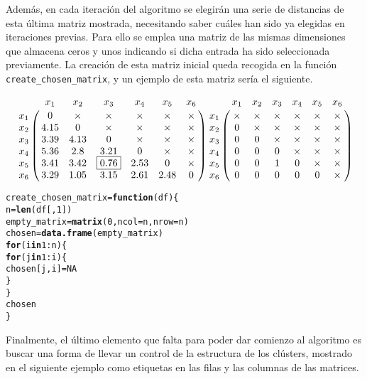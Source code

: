 \documentclass[12pt]{report}\usepackage[]{graphicx}\usepackage[dvipsnames]{xcolor}
\makeatletter
\newcommand{\hlnum}[1]{\textcolor[rgb]{0.686,0.059,0.569}{#1}}%
\newcommand{\hlopt}[1]{\textcolor[rgb]{0,0,0}{#1}}%
\newcommand{\hlstd}[1]{\textcolor[rgb]{0.345,0.345,0.345}{#1}}%
\newcommand{\hlkwa}[1]{\textcolor[rgb]{0.161,0.373,0.58}{\textbf{#1}}}%
\newcommand{\hlkwb}[1]{\textcolor[rgb]{0.69,0.353,0.396}{#1}}%
\newcommand{\hlkwc}[1]{\textcolor[rgb]{0.333,0.667,0.333}{#1}}%
\newcommand{\hlkwd}[1]{\textcolor[rgb]{0.737,0.353,0.396}{\textbf{#1}}}%
\newenvironment{kframe}{%
 \def\at@end@of@kframe{}%
 \ifinner\ifhmode%
  \def\at@end@of@kframe{\end{minipage}}%
  \begin{minipage}{\columnwidth}%
 \fi\fi%
 \def\FrameCommand##1{\hskip\@totalleftmargin \hskip-\fboxsep
 \colorbox{shadecolor}{##1}\hskip-\fboxsep
     \hskip-\linewidth \hskip-\@totalleftmargin \hskip\columnwidth}%
 \MakeFramed {\advance\hsize-\width
   \@totalleftmargin\z@ \linewidth\hsize
   \@setminipage}}%
 {\par\unskip\endMakeFramed%
 \at@end@of@kframe}
\newenvironment{knitrout}{}{} %
\makeatother
\begin{document}
		 		Además, en cada iteración del algoritmo se elegirán una serie de distancias de esta última matriz mostrada, necesitando saber cuáles han sido ya elegidas en iteraciones previas. Para ello se emplea una matriz de las mismas dimensiones que almacena ceros y unos indicando si dicha entrada ha sido seleccionada previamente. La creación de esta matriz inicial queda recogida en la función \texttt{create\_chosen\_matrix}, y un ejemplo de esta matriz sería el siguiente. 
		 		
		 		$$
		 		\bordermatrix{
		 			& x_1 & x_2 & x_3 & x_4 & x_5 & x_6 \cr
		 			x_1 & 0 & \times & \times & \times & \times & \times\cr
		 			x_2 & 4.15 & 0 & \times & \times & \times & \times\cr
		 			x_3 & 3.39 & 4.13 & 0 & \times & \times & \times\cr
		 			x_4 & 5.36 & 2.8 & 3.21 & 0 & \times & \times\cr
		 			x_5 & 3.41 & 3.42 & \boxed{0.76} & 2.53 & 0 & \times\cr
		 			x_6 & 3.29 & 1.05 & 3.15 & 2.61 & 2.48 & 0
		 		}
		 		\bordermatrix{
		 			& x_1 & x_2 & x_3 & x_4 & x_5 & x_6 \cr
		 			x_1 & \times & \times & \times & \times & \times & \times\cr
		 			x_2 & 0 & \times & \times & \times & \times & \times\cr
		 			x_3 & 0 & 0 & \times & \times & \times & \times\cr
		 			x_4 & 0 & 0 & 0 & \times & \times & \times\cr
		 			x_5 & 0 & 0 & 1 & 0 & \times & \times\cr
		 			x_6 & 0 & 0 & 0 & 0 & 0 & \times
		 		}
		 		$$
		 		
\begin{knitrout}
\color{fgcolor}\begin{kframe}
\begin{alltt}
\hlstd{create_chosen_matrix} \hlkwb{=} \hlkwa{function}\hlstd{(}\hlkwc{df}\hlstd{) \{}
        \hlstd{n} \hlkwb{=} \hlkwd{len}\hlstd{(df[,} \hlnum{1}\hlstd{])}
        \hlstd{empty_matrix} \hlkwb{=} \hlkwd{matrix}\hlstd{(}\hlnum{0}\hlstd{,} \hlkwc{ncol} \hlstd{= n,} \hlkwc{nrow} \hlstd{= n)}
        \hlstd{chosen} \hlkwb{=} \hlkwd{data.frame}\hlstd{(empty_matrix)}
        \hlkwa{for} \hlstd{(i} \hlkwa{in} \hlnum{1}\hlopt{:}\hlstd{n) \{}
                \hlkwa{for} \hlstd{(j} \hlkwa{in} \hlnum{1}\hlopt{:}\hlstd{i) \{}
                        \hlstd{chosen[j, i]} \hlkwb{=} \hlnum{NA}
                \hlstd{\}}
        \hlstd{\}}
        \hlstd{chosen}
\hlstd{\}}
\end{alltt}
\end{kframe}
\end{knitrout}
		 		
		 		Finalmente, el último elemento que falta para poder dar comienzo al algoritmo es buscar una forma de llevar un control de la estructura de los clústers, mostrado en el siguiente ejemplo como etiquetas en las filas y las columnas de las matrices. 
		 		
\end{document}
